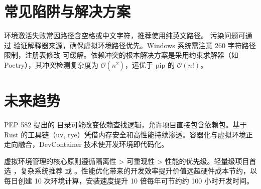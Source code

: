 \chapter{常见陷阱与解决方案}
环境激活失败常因路径含空格或中文字符，推荐使用纯英文路径。 污染问题可通过  验证解释器来源，确保虚拟环境路径优先。Windows 系统需注意 260 字符路径限制，注册表修改  可缓解。依赖冲突的根本解决方案是采用约束求解器（如 Poetry），其冲突检测复杂度为 $\mathcal{O}(n^2)$，远优于 pip 的 $\mathcal{O}(n!)$。\par
\chapter{未来趋势}
PEP 582 提出的  目录可能改变依赖查找逻辑，允许项目直接包含依赖包。基于 Rust 的工具链（uv, rye）凭借内存安全和高性能持续渗透。容器化与虚拟环境正走向融合，DevContainer 技术使开发环境即代码化。\par
虚拟环境管理的核心原则遵循隔离性 > 可重现性 > 性能的优先级。轻量级项目首选 ，复杂系统推荐  或 。性能优化带来的开发效率提升价值远超硬件成本节约，以每日创建 10 次环境计算，安装速度提升 10 倍每年可节约约 100 小时开发时间。\par
